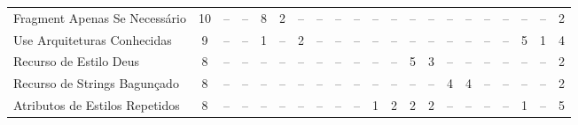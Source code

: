 \begin{table*}[t]
\begin{tabular}{@{}p{3.8cm}p{0.3cm}p{.2cm}p{.2cm}p{.2cm}p{.2cm}p{.2cm}p{.2cm}p{.2cm}p{.2cm}p{.2cm}p{.4cm}p{.4cm}p{.4cm}p{.4cm}p{.4cm}p{.4cm}p{.4cm}p{.4cm}p{.4cm}p{0.2cm}@{}}
Fragment Apenas Se Necess\'ario				& \multicolumn{1}{c}{10} 	& \multicolumn{1}{c}{--} 	& \multicolumn{1}{c}{--} 	& \multicolumn{1}{c}{8} 	& \multicolumn{1}{c}{2} 	& \multicolumn{1}{c}{--} 	& \multicolumn{1}{c}{--} 	& \multicolumn{1}{c}{--} 	& \multicolumn{1}{c}{--} 	& \multicolumn{1}{c}{--} 	& \multicolumn{1}{c}{--} 	& \multicolumn{1}{c}{--} 	& \multicolumn{1}{c}{--} 	& \multicolumn{1}{c}{--} 	& \multicolumn{1}{c}{--} 	& \multicolumn{1}{c}{--} 	& \multicolumn{1}{c}{--} 	& \multicolumn{1}{c}{--} 	& \multicolumn{1}{c}{--} 	& \multicolumn{1}{c}{2} \\
Use Arquiteturas Conhecidas					& \multicolumn{1}{c}{9} 	& \multicolumn{1}{c}{--} 	& \multicolumn{1}{c}{--} 	& \multicolumn{1}{c}{1} 	& \multicolumn{1}{c}{--} 	& \multicolumn{1}{c}{2} 	& \multicolumn{1}{c}{--} 	& \multicolumn{1}{c}{--} 	& \multicolumn{1}{c}{--} 	& \multicolumn{1}{c}{--} 	& \multicolumn{1}{c}{--} 	& \multicolumn{1}{c}{--} 	& \multicolumn{1}{c}{--} 	& \multicolumn{1}{c}{--} 	& \multicolumn{1}{c}{--} 	& \multicolumn{1}{c}{--} 	& \multicolumn{1}{c}{--} 	& \multicolumn{1}{c}{5} 	& \multicolumn{1}{c}{1} 	& \multicolumn{1}{c}{4} \\
Recurso de Estilo Deus						& \multicolumn{1}{c}{8} 	& \multicolumn{1}{c}{--} 	& \multicolumn{1}{c}{--} 	& \multicolumn{1}{c}{--} 	& \multicolumn{1}{c}{--} 	& \multicolumn{1}{c}{--} 	& \multicolumn{1}{c}{--} 	& \multicolumn{1}{c}{--} 	& \multicolumn{1}{c}{--} 	& \multicolumn{1}{c}{--} 	& \multicolumn{1}{c}{--} 	& \multicolumn{1}{c}{5} 	& \multicolumn{1}{c}{3} 	& \multicolumn{1}{c}{--} 	& \multicolumn{1}{c}{--} 	& \multicolumn{1}{c}{--} 	& \multicolumn{1}{c}{--} 	& \multicolumn{1}{c}{--} 	& \multicolumn{1}{c}{--} 	& \multicolumn{1}{c}{2} \\
Recurso de Strings Bagun\c{c}ado			& \multicolumn{1}{c}{8} 	& \multicolumn{1}{c}{--} 	& \multicolumn{1}{c}{--} 	& \multicolumn{1}{c}{--} 	& \multicolumn{1}{c}{--} 	& \multicolumn{1}{c}{--} 	& \multicolumn{1}{c}{--} 	& \multicolumn{1}{c}{--} 	& \multicolumn{1}{c}{--} 	& \multicolumn{1}{c}{--} 	& \multicolumn{1}{c}{--} 	& \multicolumn{1}{c}{--} 	& \multicolumn{1}{c}{--} 	& \multicolumn{1}{c}{4} 	& \multicolumn{1}{c}{4} 	& \multicolumn{1}{c}{--} 	& \multicolumn{1}{c}{--} 	& \multicolumn{1}{c}{--} 	& \multicolumn{1}{c}{--} 	& \multicolumn{1}{c}{2} \\
Atributos de Estilos Repetidos				& \multicolumn{1}{c}{8} 	& \multicolumn{1}{c}{--} 	& \multicolumn{1}{c}{--} 	& \multicolumn{1}{c}{--} 	& \multicolumn{1}{c}{--} 	& \multicolumn{1}{c}{--} 	& \multicolumn{1}{c}{--} 	& \multicolumn{1}{c}{--} 	& \multicolumn{1}{c}{--} 	& \multicolumn{1}{c}{1} 	& \multicolumn{1}{c}{2} 	& \multicolumn{1}{c}{2} 	& \multicolumn{1}{c}{2} 	& \multicolumn{1}{c}{--} 	& \multicolumn{1}{c}{--} 	& \multicolumn{1}{c}{--} 	& \multicolumn{1}{c}{--} 	& \multicolumn{1}{c}{1} 	& \multicolumn{1}{c}{--} 	& \multicolumn{1}{c}{5} \\


\end{tabular}
\end{table*}
